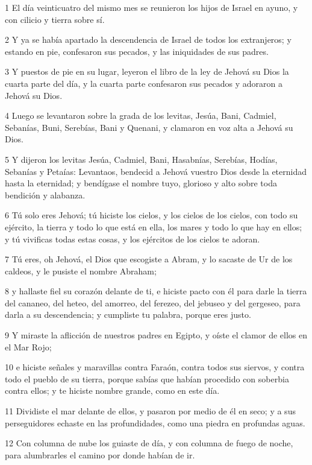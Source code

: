 \par 1 El día veinticuatro del mismo mes se reunieron los hijos de Israel en ayuno, y con cilicio y tierra sobre sí.
\par 2 Y ya se había apartado la descendencia de Israel de todos los extranjeros; y estando en pie, confesaron sus pecados, y las iniquidades de sus padres.
\par 3 Y puestos de pie en su lugar, leyeron el libro de la ley de Jehová su Dios la cuarta parte del día, y la cuarta parte confesaron sus pecados y adoraron a Jehová su Dios.
\par 4 Luego se levantaron sobre la grada de los levitas, Jesúa, Bani, Cadmiel, Sebanías, Buni, Serebías, Bani y Quenani, y clamaron en voz alta a Jehová su Dios.
\par 5 Y dijeron los levitas Jesúa, Cadmiel, Bani, Hasabnías, Serebías, Hodías, Sebanías y Petaías: Levantaos, bendecid a Jehová vuestro Dios desde la eternidad hasta la eternidad; y bendígase el nombre tuyo, glorioso y alto sobre toda bendición y alabanza.
\par 6 Tú solo eres Jehová; tú hiciste los cielos, y los cielos de los cielos, con todo su ejército, la tierra y todo lo que está en ella, los mares y todo lo que hay en ellos; y tú vivificas todas estas cosas, y los ejércitos de los cielos te adoran.
\par 7 Tú eres, oh Jehová, el Dios que escogiste a Abram, y lo sacaste de Ur de los caldeos, y le pusiste el nombre Abraham; 
\par 8 y hallaste fiel su corazón delante de ti, e hiciste pacto con él para darle la tierra del cananeo, del heteo, del amorreo, del ferezeo, del jebuseo y del gergeseo, para darla a su descendencia; y cumpliste tu palabra, porque eres justo.
\par 9 Y miraste la aflicción de nuestros padres en Egipto, y oíste el clamor de ellos en el Mar Rojo; 
\par 10 e hiciste señales y maravillas contra Faraón, contra todos sus siervos, y contra todo el pueblo de su tierra, porque sabías que habían procedido con soberbia contra ellos; y te hiciste nombre grande, como en este día.
\par 11 Dividiste el mar delante de ellos, y pasaron por medio de él en seco; y a sus perseguidores echaste en las profundidades, como una piedra en profundas aguas. 
\par 12 Con columna de nube los guiaste de día, y con columna de fuego de noche, para alumbrarles el camino por donde habían de ir. 
